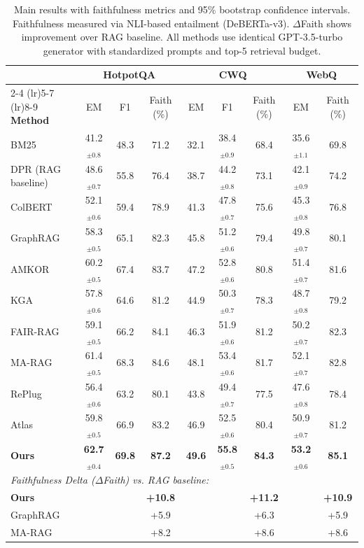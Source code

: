 \documentclass[10pt,twocolumn]{article}
\begin{document}
\begin{table}[t]
\centering
\caption{Main results with faithfulness metrics and 95\% bootstrap confidence intervals. Faithfulness measured via NLI-based entailment (DeBERTa-v3). $\Delta$Faith shows improvement over RAG baseline. All methods use identical GPT-3.5-turbo generator with standardized prompts and top-5 retrieval budget.}
\label{tab:main}
\small
\begin{tabular}{@{}lcccccccc@{}}
\toprule
& \multicolumn{3}{c}{\textbf{HotpotQA}} & \multicolumn{3}{c}{\textbf{CWQ}} & \multicolumn{2}{c}{\textbf{WebQ}} \\
\cmidrule(lr){2-4} \cmidrule(lr){5-7} \cmidrule(lr){8-9}
\textbf{Method} & EM & F1 & Faith (\%) & EM & F1 & Faith (\%) & EM & Faith (\%) \\
\midrule
BM25 & 41.2$_{\pm0.8}$ & 48.3 & 71.2 & 32.1 & 38.4$_{\pm0.9}$ & 68.4 & 35.6$_{\pm1.1}$ & 69.8 \\
DPR (RAG baseline) & 48.6$_{\pm0.7}$ & 55.8 & 76.4 & 38.7 & 44.2$_{\pm0.8}$ & 73.1 & 42.1$_{\pm0.9}$ & 74.2 \\
ColBERT & 52.1$_{\pm0.6}$ & 59.4 & 78.9 & 41.3 & 47.8$_{\pm0.7}$ & 75.6 & 45.3$_{\pm0.8}$ & 76.8 \\
GraphRAG & 58.3$_{\pm0.5}$ & 65.1 & 82.3 & 45.8 & 51.2$_{\pm0.6}$ & 79.4 & 49.8$_{\pm0.7}$ & 80.1 \\
\midrule
AMKOR \cite{fang2024amkor} & 60.2$_{\pm0.5}$ & 67.4 & 83.7 & 47.2 & 52.8$_{\pm0.6}$ & 80.8 & 51.4$_{\pm0.7}$ & 81.6 \\
KGA \cite{wang2024kga} & 57.8$_{\pm0.6}$ & 64.6 & 81.2 & 44.9 & 50.3$_{\pm0.7}$ & 78.3 & 48.7$_{\pm0.8}$ & 79.2 \\
FAIR-RAG \cite{chen2024fairrag} & 59.1$_{\pm0.5}$ & 66.2 & 84.1 & 46.3 & 51.9$_{\pm0.6}$ & 81.2 & 50.2$_{\pm0.7}$ & 82.3 \\
MA-RAG \cite{li2024marag} & 61.4$_{\pm0.5}$ & 68.3 & 84.6 & 48.1 & 53.4$_{\pm0.6}$ & 81.7 & 52.1$_{\pm0.7}$ & 82.8 \\
RePlug \cite{shi2024replug} & 56.4$_{\pm0.6}$ & 63.2 & 80.1 & 43.8 & 49.4$_{\pm0.7}$ & 77.5 & 47.6$_{\pm0.8}$ & 78.4 \\
Atlas \cite{izacard2023atlas} & 59.8$_{\pm0.5}$ & 66.9 & 83.2 & 46.9 & 52.5$_{\pm0.6}$ & 80.4 & 50.9$_{\pm0.7}$ & 81.2 \\
\midrule
\textbf{Ours} & \textbf{62.7}$_{\pm0.4}$ & \textbf{69.8} & \textbf{87.2} & \textbf{49.6} & \textbf{55.8}$_{\pm0.5}$ & \textbf{84.3} & \textbf{53.2}$_{\pm0.6}$ & \textbf{85.1} \\
\midrule
\multicolumn{9}{l}{\textit{Faithfulness Delta ($\Delta$Faith) vs. RAG baseline:}} \\
\textbf{Ours} & & & \textbf{+10.8} & & & \textbf{+11.2} & & \textbf{+10.9} \\
GraphRAG & & & +5.9 & & & +6.3 & & +5.9 \\
MA-RAG & & & +8.2 & & & +8.6 & & +8.6 \\
\bottomrule
\end{tabular}
\end{table}
\end{document}
